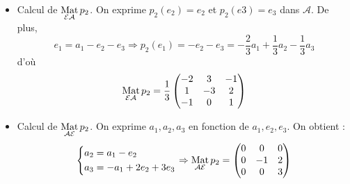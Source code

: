 \begin{enumerate}
\begin{itemize}
\item Calcul de $\underset{\mathcal{E A}}{\operatorname{Mat}}\, p_2$. On exprime $p_2(e_2)=e_2$ et $p_2(e3)=e_3$ dans $\mathcal A$. De plus,
\begin{displaymath}
e_1=a_1-e_2-e_3\Rightarrow p_2(e_1)=-e_2 -e_3 = -\frac{2}{3}a_1 +\frac{1}{3}a_2 -\frac{1}{3}a_3
\end{displaymath}
d'où
\begin{displaymath}
\underset{\mathcal{E A}}{\operatorname{Mat}}\, p_2 = \frac{1}{3}
\begin{pmatrix}
 -2 & 3 & -1 \\
1 & -3  & 2 \\
-1 & 0 & 1
\end{pmatrix}
\end{displaymath}

\item Calcul de $\underset{\mathcal{A}\mathcal{E}}{\operatorname{Mat}}\, p_2$. On exprime $a_1, a_2, a_3$ en fonction de $a_1,e_2, e_3$. On obtient :
\begin{displaymath}
\left\lbrace 
\begin{aligned}
 a_2 &= a_1 -e_2\\
 a_3 &=-a_1+2e_2+3e_3
\end{aligned}
\right. \Rightarrow
 \underset{\mathcal{A E}}{\operatorname{Mat}}\, p_2 =
\begin{pmatrix}
0 & 0 & 0 \\
0 & -1  & 2 \\
0 & 0 & 3
\end{pmatrix}
\end{displaymath}

\end{itemize}
\end{enumerate}
